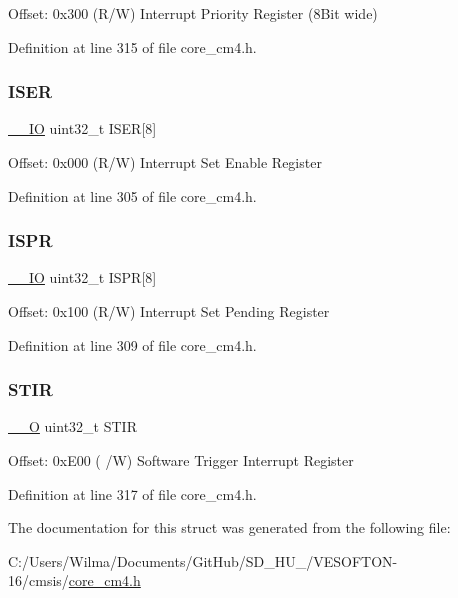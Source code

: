 Offset\+: 0x300 (R/W) Interrupt Priority Register (8\+Bit wide) 

Definition at line 315 of file core\+\_\+cm4.\+h.

\mbox{\label{struct_n_v_i_c___type_a0bf79013b539f9f929c75bd50f8ec67d}} 
\subsubsection{\texorpdfstring{I\+S\+ER}{ISER}}
{\footnotesize\ttfamily \hyperlink{group___c_m_s_i_s__core__definitions_gaec43007d9998a0a0e01faede4133d6be}{\+\_\+\+\_\+\+IO} uint32\+\_\+t I\+S\+ER\mbox{[}8\mbox{]}}

Offset\+: 0x000 (R/W) Interrupt Set Enable Register 

Definition at line 305 of file core\+\_\+cm4.\+h.

\mbox{\label{struct_n_v_i_c___type_ab39acf254b485e3ad71b18aa9f1ca594}} 
\subsubsection{\texorpdfstring{I\+S\+PR}{ISPR}}
{\footnotesize\ttfamily \hyperlink{group___c_m_s_i_s__core__definitions_gaec43007d9998a0a0e01faede4133d6be}{\+\_\+\+\_\+\+IO} uint32\+\_\+t I\+S\+PR\mbox{[}8\mbox{]}}

Offset\+: 0x100 (R/W) Interrupt Set Pending Register 

Definition at line 309 of file core\+\_\+cm4.\+h.

\mbox{\label{struct_n_v_i_c___type_a471c399bb79454dcdfb342a31a5684ae}} 
\subsubsection{\texorpdfstring{S\+T\+IR}{STIR}}
{\footnotesize\ttfamily \hyperlink{group___c_m_s_i_s__core__definitions_ga7e25d9380f9ef903923964322e71f2f6}{\+\_\+\+\_\+O} uint32\+\_\+t S\+T\+IR}

Offset\+: 0x\+E00 ( /W) Software Trigger Interrupt Register 

Definition at line 317 of file core\+\_\+cm4.\+h.



The documentation for this struct was generated from the following file\+:\begin{DoxyCompactItemize}
\item 
C\+:/\+Users/\+Wilma/\+Documents/\+Git\+Hub/\+S\+D\+\_\+\+H\+U\+\_/\+V\+E\+S\+O\+F\+T\+O\+N-\/16/cmsis/\hyperlink{core__cm4_8h}{core\+\_\+cm4.\+h}\end{DoxyCompactItemize}
